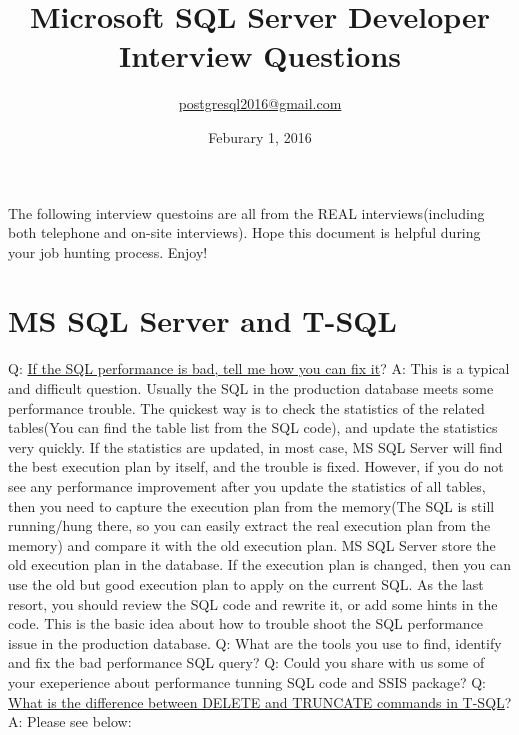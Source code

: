 \documentclass[a4paper,11pt]{article}
\begin{document}
\title{Microsoft SQL Server Developer Interview Questions}
\author{\url{postgresql2016@gmail.com}}
\date{Feburary 1, 2016}
\maketitle
The following interview questoins are all from the REAL interviews(including both telephone and on-site interviews). Hope this document is helpful during your job hunting process. Enjoy!
\section{MS SQL Server and T-SQL}
Q: \ul{If the SQL performance is bad, tell me how you can fix it}? \newline
A: This is a typical and difficult question. Usually the SQL in the production database meets some performance trouble. The quickest way is to check the statistics of the related tables(You can find the table list from the SQL code), and update the statistics very quickly. If the statistics are updated, in most case, MS SQL Server will find the best execution plan by itself, and the trouble is fixed. However, if you do not see any performance improvement after you update the statistics of all tables, then you need to capture the execution plan from the memory(The SQL is still running/hung there, so you can easily extract the real execution plan from the memory) and compare it with the old execution plan. MS SQL Server store the old execution plan in the database. If the execution plan is changed, then you can use the old but good execution plan to apply on the current SQL. As the last resort, you should review the SQL code and rewrite it, or add some hints in the code. This is the basic idea about how to trouble shoot the SQL performance issue in the production database.\newline \newline
\noindent 
Q: What are the tools you use to find, identify and fix the bad performance SQL query? \newline \newline
\noindent 
Q: Could you share with us some of your exeperience about performance tunning SQL code and SSIS package? \newline \newline
\noindent 
Q: \ul{What is the difference between DELETE and TRUNCATE commands in T-SQL}? \newline 
A: Please see below:
\end{document}
